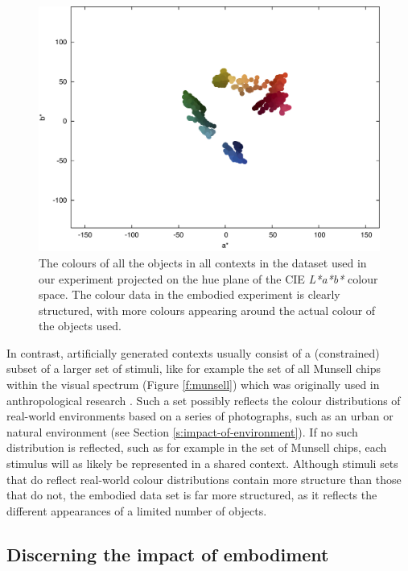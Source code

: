 \begin{figure}[htbp]
\begin{center}
\includegraphics[width=\textwidth]{./experiments/figures/grounding-grounded-world.pdf}
\caption[Structure of the grounded data set]{The colours of all the
  objects in all contexts in the dataset used in our experiment
  projected on the hue plane of the CIE \emph{L*a*b*} colour
  space. The colour data in the embodied experiment is clearly
  structured, with more colours appearing around the actual colour of
  the objects used.}
\label{fig:grounded-world}
\end{center}
\end{figure}

In contrast, artificially generated contexts usually consist of a
(constrained) subset of a larger set of stimuli, like for example the
set of all Munsell chips within the visual spectrum (Figure
\ref{f:munsell}) which was originally used in anthropological research
\citep{kay10world, maclaury97color}. Such a set possibly reflects the
colour distributions of real-world environments based on a series of
photographs, such as an urban or natural environment (see Section
\ref{s:impact-of-environment}). If no such distribution is reflected,
such as for example in the set of Munsell chips, each stimulus will as
likely be represented in a shared context. Although stimuli sets that
do reflect real-world colour distributions contain more structure than
those that do not, the embodied data set is far more structured, as it
reflects the different appearances of a limited number of objects.

\subsection{Discerning the impact of embodiment}

